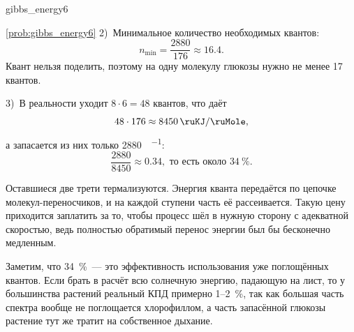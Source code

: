 \begin{problem}{}{gibbs_energy6}
\begin{sol}{\ref{prob:gibbs_energy6}}
        2)~Минимальное количество необходимых квантов:
        \begin{equation*}
            n_{\min} = \frac{\num{2880}}{\num{176}} \approx \num{16,4}.
        \end{equation*}
        Квант нельзя поделить, поэтому на одну молекулу глюкозы нужно не менее \num{17} квантов.

        3)~В реальности уходит $8 \cdot 6 = \num{48}$ квантов, что даёт
        \begin{equation*}
            \num{48} \cdot \num{176} \approx \qty{8450}{\ruKJ\per\ruMole},
        \end{equation*}
        а запасается из них только \qty{2880}{\ruKJ\per\ruMole}:
        \begin{equation*}
            \frac{\num{2880}}{\num{8450}} \approx \num{0,34}, \text{ то есть около } \qty{34}{\percent}.
        \end{equation*}

        Оставшиеся две трети термализуются. Энергия кванта передаётся по цепочке молекул-переносчиков, и на каждой ступени часть её рассеивается. Такую цену приходится заплатить за то, чтобы процесс шёл в нужную сторону с адекватной скоростью, ведь полностью обратимый перенос энергии был бы бесконечно медленным.

        Заметим, что \qty{34}{\percent}~--- это эффективность использования уже поглощённых квантов. Если брать в расчёт всю солнечную энергию, падающую на лист, то у большинства растений реальный КПД примерно \num{1}--\qty{2}{\percent}, так как большая часть спектра вообще не поглощается хлорофиллом, а часть запасённой глюкозы растение тут же тратит на собственное дыхание.
    \end{sol}
\end{problem}

